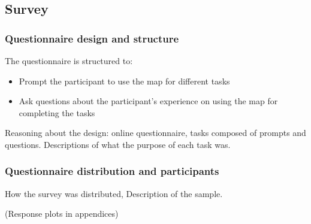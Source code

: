 



\subsection{Survey}

\subsubsection{Questionnaire design and structure}

The questionnaire is structured to:
\begin{itemize}
	\item Prompt the participant to use the map for different tasks
	\item Ask questions about the participant's experience
	on using the map for completing the tasks
\end{itemize}

Reasoning about the design: online questionnaire, tasks composed of prompts and questions.
Descriptions of what the purpose of each task was.

\subsubsection{Questionnaire distribution and participants}
How the survey was distributed,
Description of the sample.

(Response plots in appendices)
